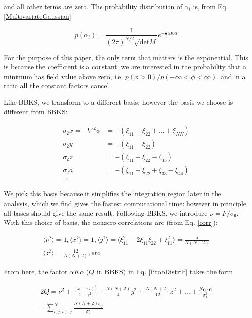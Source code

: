\documentclass[12pt]{article}
\begin{document}
\noindent and all other terms are zero. The probability distribution of $\alpha_i$ is, from Eq. \ref{MultivariateGaussian}

\begin{equation} \label{ProbDistrib}
p(\alpha_i)=\frac{1}{(2\pi)^{N/2}\sqrt{\mathrm{det}M}} e^{-\frac{1}{2}\alpha K \alpha}
\end{equation}

For the purpose of this paper, the only term that matters is the exponential. This is because the coefficient is a constant, we are interested in the probability that a minimum has field value above zero, i.e. $p(\phi>0)/p(-\infty<\phi<\infty)$, and in a ratio all the constant factors cancel.

Like BBKS, we transform to a different basis; however the basis we choose is different from BBKS:

\begin{align*}
\begin{split}
\sigma_2x = -\nabla^2\phi &= -(\xi_{11}+\xi_{22}+\ldots+\xi_{NN})\\
\sigma_2y &= -(\xi_{11}-\xi_{22})\\
\sigma_2z &= -(\xi_{11}+\xi_{22}-\xi_{33})\\
\sigma_2a &= -(\xi_{11}+\xi_{22}+\xi_{33}-\xi_{44})\\
\ldots
\end{split}
\end{align*}

We pick this basis because it simplifies the integration region later in the analysis, which we find gives the fastest computational time; however in principle all bases should give the same result. Following BBKS, we introduce $\nu = F/\sigma_0$. With this choice of basis, the nonzero correlations are (from Eq. \ref{corr}):

\begin{gather}
\langle\nu^2\rangle = 1, \langle x^2\rangle=1, \langle y^2 \rangle = \langle \xi_{11}^2 -2\xi_{11}\xi_{22} + \xi_{11}^2\rangle = \frac{4}{N(N+2)} \\
\langle z^2 \rangle = \frac{12}{N(N+2)}, etc.
\end{gather}

From here, the factor $\alpha K \alpha$ ($Q$ in BBKS) in Eq. \ref{ProbDistrib} takes the form

\begin{equation} \label{Q}
\begin{split}
2Q = \nu^2 + \frac{(x-x_*)^2}{1-\gamma^2} + \frac{N(N+2)}{4}y^2 + \frac{N(N+2)}{12}z^2 + \ldots + \frac{N \pmb{\eta}\cdot \pmb{\eta}}{\sigma_1^2} \\
+ \sum_{i,j;i > j}^N\frac{N(N+2)\xi_{ij}}{\sigma_2^2}
\end{split}
\end{equation}
\end{document}
